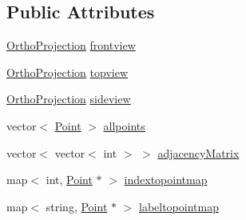 \subsection*{Public Attributes}
\begin{DoxyCompactItemize}
\item 
\hyperlink{class_ortho_projection}{Ortho\+Projection} \hyperlink{class_projection2_d_a1eb4d010190b1bd62bf0f9c4e4afc88a}{frontview}
\item 
\hyperlink{class_ortho_projection}{Ortho\+Projection} \hyperlink{class_projection2_d_a90079954379a766f60ba01ad393327ab}{topview}
\item 
\hyperlink{class_ortho_projection}{Ortho\+Projection} \hyperlink{class_projection2_d_a82c9e3f197b07ffe9a10f59de60edbee}{sideview}
\item 
vector$<$ \hyperlink{class_point}{Point} $>$ \hyperlink{class_projection2_d_aacafd767e5289005e7ec5d48c791d02f}{allpoints}
\item 
vector$<$ vector$<$ int $>$ $>$ \hyperlink{class_projection2_d_a0a4be368b0a7233a1aa93efe17c7314e}{adjacency\+Matrix}
\item 
map$<$ int, \hyperlink{class_point}{Point} $\ast$ $>$ \hyperlink{class_projection2_d_a08675aad4022218dc78dd54187be18a9}{indextopointmap}
\item 
map$<$ string, \hyperlink{class_point}{Point} $\ast$ $>$ \hyperlink{class_projection2_d_a0afd92ccd321bc86e6e019b4bec99fc8}{labeltopointmap}
\end{DoxyCompactItemize}
